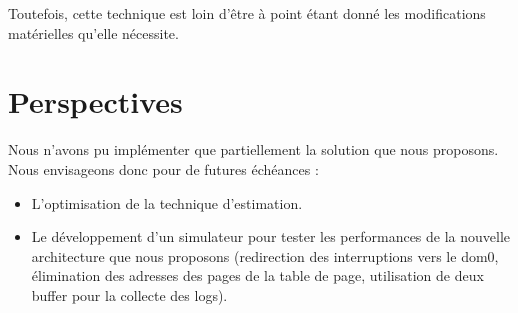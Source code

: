 \begin{table}[H]
  \begin{center}
    \caption{Tableau comparatif des techniques d'estimation du WSS existantes}
  \end{center}
\end{table}
\noindent Toutefois, cette technique est loin d'être à point étant donné les modifications matérielles qu'elle nécessite.

\section*{Perspectives}
Nous n'avons pu implémenter que partiellement la solution que nous proposons. Nous envisageons donc pour de futures échéances :
\begin{itemize}[label=]
    \item L'optimisation de la technique d'estimation.
    \item Le développement d'un simulateur pour tester les performances de la nouvelle architecture que nous proposons (redirection des interruptions vers le dom0, élimination des adresses des pages de la table de page, utilisation de deux buffer pour la collecte des logs).
\end{itemize}
